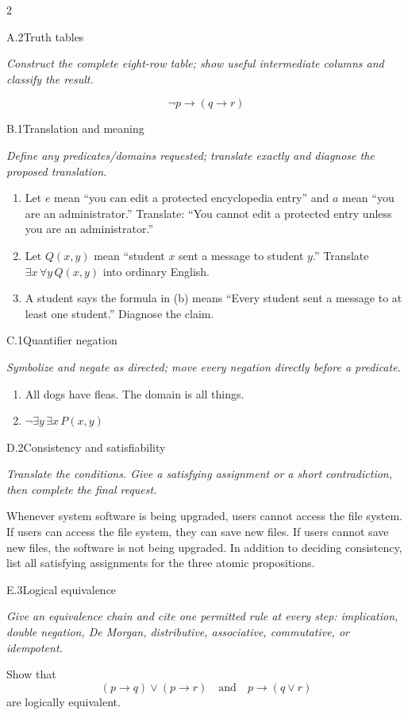 \documentclass[9pt]{extarticle}
\begin{document}
\CoreWorkArea
\FormBreak
{}
\begin{multicols}{2}
\begin{CoreProblem}{A.2}{Truth tables}
{\scriptsize\textit{Construct the complete eight-row table; show useful intermediate columns and classify the result.}\par}
\[
  \neg p\to(q\to r)
\]
\end{CoreProblem}
\begin{CoreProblem}{B.1}{Translation and meaning}
{\scriptsize\textit{Define any predicates/domains requested; translate exactly and diagnose the proposed translation.}\par}
\begin{enumerate}[label=(\alph*)]
  \item Let $e$ mean ``you can edit a protected encyclopedia entry'' and $a$
        mean ``you are an administrator.'' Translate: ``You cannot edit a
        protected entry unless you are an administrator.''
  \item Let $Q(x,y)$ mean ``student $x$ sent a message to student $y$.''
        Translate $\exists x\,\forall y\,Q(x,y)$ into ordinary English.
  \item A student says the formula in (b) means ``Every student sent a message
        to at least one student.'' Diagnose the claim.
\end{enumerate}
\end{CoreProblem}
\begin{CoreProblem}{C.1}{Quantifier negation}
{\scriptsize\textit{Symbolize and negate as directed; move every negation directly before a predicate.}\par}
\begin{enumerate}[label=(\alph*)]
  \item All dogs have fleas. The domain is all things.
  \item $\neg\exists y\,\exists x\,P(x,y)$
\end{enumerate}
\end{CoreProblem}
\columnbreak
\begin{CoreProblem}{D.2}{Consistency and satisfiability}
{\scriptsize\textit{Translate the conditions. Give a satisfying assignment or a short contradiction, then complete the final request.}\par}
Whenever system software is being upgraded, users cannot access the file
system. If users can access the file system, they can save new files. If users
cannot save new files, the software is not being upgraded. In addition to
deciding consistency, list all satisfying assignments for the three atomic
propositions.
\end{CoreProblem}
\begin{CoreProblem}{E.3}{Logical equivalence}
{\scriptsize\textit{Give an equivalence chain and cite one permitted rule at every step: implication, double negation, De Morgan, distributive, associative, commutative, or idempotent.}\par}
Show that
\[
  (p\to q)\lor(p\to r)
  \quad\text{and}\quad
  p\to(q\lor r)
\]
are logically equivalent.
\end{CoreProblem}
\end{multicols}
\end{document}

